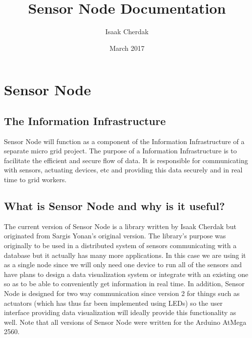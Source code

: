 \documentclass{article}
\title{Sensor Node Documentation}
\author{Isaak Cherdak}
\date{March 2017}
\begin{document}
\maketitle

\tableofcontents

\section{Sensor Node}

\subsection{The Information Infrastructure}

Sensor Node will function as a component of the Information Infrastructure of a separate micro grid project. The purpose of a Information Infrastructure is to facilitate the efficient and secure flow of data. It is responsible for communicating with sensors, actuating devices, etc and providing this data securely and in real time to grid workers.

\subsection{What is Sensor Node and why is it useful?}

The current version of Sensor Node is a library written by Isaak Cherdak but originated from Sargis Yonan's original version. The library's purpose was originally to be used in a distributed system of sensors communicating with a database but it actually has many more applications. In this case we are using it as a single node since we will only need one device to run all of the sensors and have plans to design a data visualization system or integrate with an existing one so as to be able to conveniently get information in real time. In addition, Sensor Node is designed for two way communication since version 2 for things such as actuators (which has thus far been implemented using LEDs) so the user interface providing data visualization will ideally provide this functionality as well. Note that all versions of Sensor Node were written for the Arduino AtMega 2560.
\end{document}
